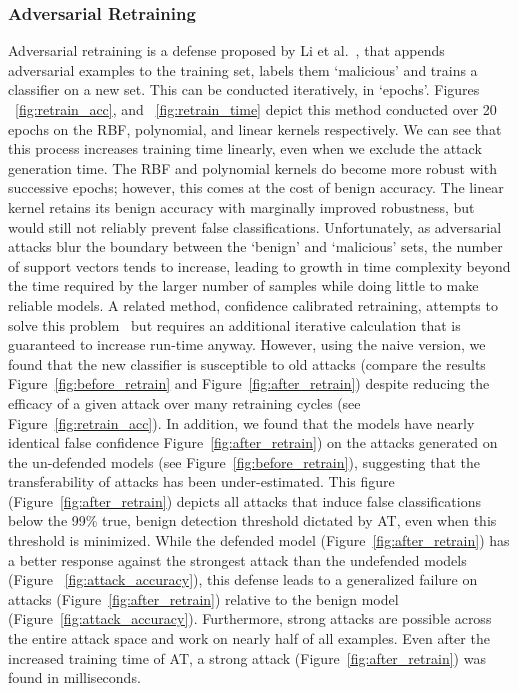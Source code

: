 \documentclass[fonts]{icst}
\begin{document}
\subsubsection{Adversarial Retraining}
Adversarial retraining is a defense proposed by  Li et al.~\cite{li2016general}, that appends adversarial examples to the training set, labels them `malicious' and trains a classifier on a new set.
This can be conducted iteratively, in `epochs'.
Figures ~\ref{fig:retrain_acc}, and ~\ref{fig:retrain_time} depict this method conducted over 20 epochs on the RBF, polynomial, and linear kernels respectively.
We can see that this process increases training time linearly, even when we exclude the attack generation time.
The RBF and polynomial kernels do become more robust with successive epochs; however, this comes at the cost of benign accuracy.
The linear kernel retains its benign accuracy with marginally improved robustness, but would still not reliably prevent false classifications.
Unfortunately, as adversarial attacks blur the boundary between the `benign' and `malicious' sets, the number of support vectors tends to increase, leading to growth in time complexity beyond the time required by the larger number of samples while doing little to make reliable models.
A related method, confidence calibrated retraining, attempts to solve this problem~\cite{croce2020reliable} but requires an additional iterative calculation that is guaranteed to increase run-time anyway.
However, using the naive version, we found that the new classifier is susceptible to old attacks (compare the results Figure~\ref{fig:before_retrain} and Figure~\ref{fig:after_retrain}) despite reducing the efficacy of a given attack over many retraining cycles (see Figure~\ref{fig:retrain_acc}).
In addition, we found that the models have nearly identical false confidence Figure~\ref{fig:after_retrain}) on the attacks generated on the un-defended models (see Figure~\ref{fig:before_retrain}), suggesting that the transferability of attacks has been under-estimated.
This figure (Figure~\ref{fig:after_retrain}) depicts all attacks that induce false classifications below the 99\% true, benign detection threshold dictated by AT, even when this threshold is minimized.
While the defended model (Figure~\ref{fig:after_retrain}) has a better response against the strongest attack  than the undefended models (Figure ~\ref{fig:attack_accuracy}), this defense leads to a generalized failure on attacks (Figure~\ref{fig:after_retrain}) relative to the benign model (Figure~\ref{fig:attack_accuracy}).
Furthermore, strong attacks are possible across the entire attack space and work on nearly half of all examples.
Even after the increased training time of AT, a strong attack  (Figure~\ref{fig:after_retrain}) was found in milliseconds.
\end{document}
